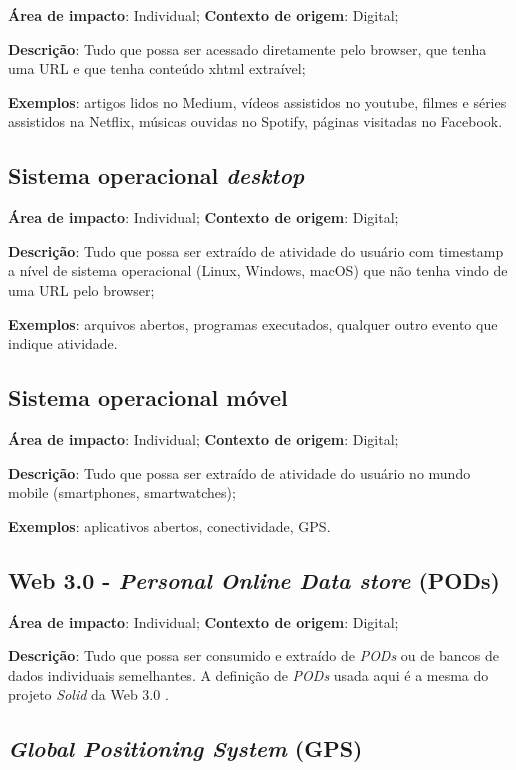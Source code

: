 \textbf{Área de impacto}: Individual; \textbf{Contexto de origem}: Digital;

\textbf{Descrição}: Tudo que possa ser acessado diretamente pelo browser, que tenha uma URL e que tenha conteúdo xhtml extraível;

\textbf{Exemplos}: artigos lidos no Medium, vídeos assistidos no youtube, filmes e séries assistidos na Netflix, músicas ouvidas no Spotify, páginas visitadas no Facebook.

\subsection{Sistema operacional \textit{desktop}}

\textbf{Área de impacto}: Individual; \textbf{Contexto de origem}: Digital;

\textbf{Descrição}: Tudo que possa ser extraído de atividade do usuário com timestamp a nível de sistema operacional (Linux, Windows, macOS) que não tenha vindo de uma URL pelo browser;

\textbf{Exemplos}: arquivos abertos, programas executados, qualquer outro evento que indique atividade.

\subsection{Sistema operacional móvel}

\textbf{Área de impacto}: Individual; \textbf{Contexto de origem}: Digital;

\textbf{Descrição}: Tudo que possa ser extraído de atividade do usuário no mundo mobile (smartphones, smartwatches);

\textbf{Exemplos}: aplicativos abertos, conectividade, GPS.

\subsection{Web 3.0 - \textit{Personal Online Data store} (PODs)}

\textbf{Área de impacto}: Individual; \textbf{Contexto de origem}: Digital;

\textbf{Descrição}: Tudo que possa ser consumido e extraído de \textit{PODs} ou de bancos de dados individuais semelhantes. A definição de \textit{PODs} usada aqui é a mesma do projeto \textit{Solid} da Web 3.0 \cite{solid}.

\subsection{\textit{Global Positioning System} (GPS)}

